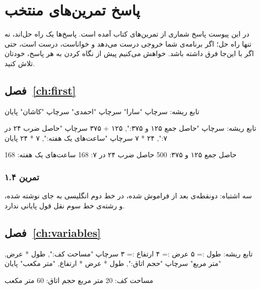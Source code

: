 \chapter{پاسخ تمرین‌های منتخب}\label{app:solutions}

در این پیوست پاسخ شماری از تمرین‌های کتاب آمده است. پاسخ‌ها یک راه حل‌اند،
نه تنها راه حل؛ اگر برنامه‌ی شما خروجی درست می‌دهد و خواناست، درست است،
حتی اگر با این‌جا فرق داشته باشد. خواهش می‌کنیم پیش از نگاه کردن به هر
پاسخ، خودتان تلاش کنید.

\section*{فصل~\ref{ch:first}}

\begin{salamfa}
تابع ریشه:
    سرچاپ "سارا"
    سرچاپ "احمدی"
    سرچاپ "کاشان"
پایان
\end{salamfa}

\begin{salamfa}
تابع ریشه:
    سرچاپ "حاصل جمع ۱۲۵ و ۳۷۵:", ۱۲۵ + ۳۷۵
    سرچاپ "حاصل ضرب ۲۴ در ۷:", ۲۴ * ۷
    سرچاپ "ساعت‌های یک هفته:", ۷ * ۲۴
پایان
\end{salamfa}
\begin{outputfa}
حاصل جمع ۱۲۵ و ۳۷۵: 500
حاصل ضرب ۲۴ در ۷: 168
ساعت‌های یک هفته: 168
\end{outputfa}

\subsection*{تمرین ۱.۴}
سه اشتباه: دونقطه‌ی بعد از  فراموش شده، در خط دوم
 انگلیسی به جای  نوشته شده، و رشته‌ی خط سوم نقل قول
پایانی ندارد.

\section*{فصل~\ref{ch:variables}}

\begin{salamfa}
تابع ریشه:
    طول := ۵
    عرض := ۴
    ارتفاع := ۳
    سرچاپ "مساحت کف:", طول * عرض, "متر مربع"
    سرچاپ "حجم اتاق:", طول * عرض * ارتفاع, "متر مکعب"
پایان
\end{salamfa}
\begin{outputfa}
مساحت کف: 20 متر مربع
حجم اتاق: 60 متر مکعب
\end{outputfa}

